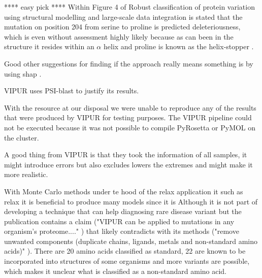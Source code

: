 **** easy pick ****
Within Figure 4 of Robust classification of protein variation using structural modelling and large-scale data integration \cite{} is stated that the mutation on position 204 from serine to proline is predicted deleteriousness, which is even without assessment highly likely because as can been in the structure it resides within an $\alpha$ helix and proline is known as the helix-stopper \cite{}.

Good other suggestions for finding if the approach really means something is by using shap \cite{}.

VIPUR uses PSI-blast to justify its results. 

With the resource at our disposal we were unable to reproduce any of the results that were produced by VIPUR for testing purposes.
The VIPUR pipeline could not be executed because it was not possible to compile PyRosetta or PyMOL on the cluster.

A good thing from VIPUR is that they took the information of all samples, it might introduce errors but also excludes lowers the extremes and might make it more realistic.



With Monte Carlo methods under te hood of the relax application it  such as relax it is beneficial to produce many models since it is
Although it is not part of developing a technique that can help diagnosing rare disease variant but the publication contains a claim ("VIPUR can be applied to mutations in any organism’s proteome...." \cite{}) that likely contradicts with its methods ("remove unwanted components (duplicate chains, ligands, metals and non-standard amino acids)" \cite{}). There are 20 amino acids classified as standard, 22 are known to be incorporated into structures of some organisms \cite{} and more variants are possible, which makes it unclear what is classified as a non-standard amino acid.




